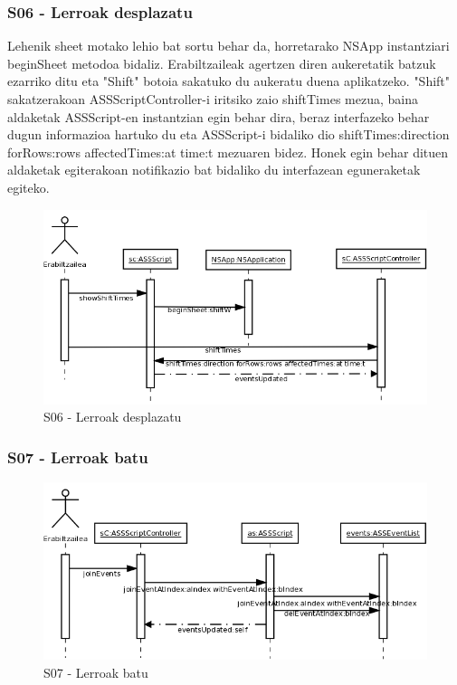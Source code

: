 \subsubsection{S06 - Lerroak desplazatu}
Lehenik sheet motako lehio bat sortu behar da, horretarako NSApp instantziari beginSheet metodoa bidaliz. Erabiltzaileak agertzen diren aukeretatik batzuk ezarriko ditu eta "Shift" botoia sakatuko du aukeratu duena aplikatzeko. "Shift" sakatzerakoan ASSScriptController-i iritsiko zaio shiftTimes mezua, baina aldaketak ASSScript-en instantzian egin behar dira, beraz interfazeko behar dugun informazioa hartuko du eta ASSScript-i bidaliko dio shiftTimes:direction forRows:rows affectedTimes:at time:t mezuaren bidez. Honek egin behar dituen aldaketak egiterakoan notifikazio bat bidaliko du interfazean eguneraketak egiteko.
\begin{figure}[htp]
\begin{center}
\includegraphics[scale=0.25]{Pictures/Chapter4/Diseinua/S06.png}
\caption{S06 - Lerroak desplazatu}
\label{s06d}
\end{center}
\end{figure}

\subsubsection{S07 - Lerroak batu}
\begin{figure}[htp]
\begin{center}
\includegraphics[scale=0.25]{Pictures/Chapter4/Diseinua/S07.png}
\caption{S07 - Lerroak batu}
\label{s07d}
\end{center}
\end{figure}

